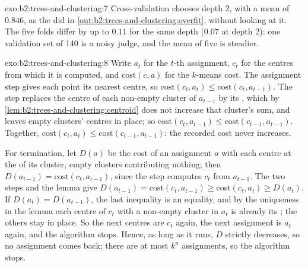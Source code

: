 \begin{solution}{exo:b2:trees-and-clustering:7}
Cross-validation chooses depth 2, with a mean of $0.846$, as the  did in \cref{out:b2:trees-and-clustering:overfit},
without looking at it. The five folds differ by up to $0.11$ for the same depth ($0.07$ at depth 2): one validation set of 140 is a noisy
judge, and the mean of five is steadier.
\end{solution}

\begin{solution}{exo:b2:trees-and-clustering:8}
Write $a_t$ for the $t$-th assignment, $c_t$ for the centres from which it is computed, and $\mathrm{cost}(c, a)$ for
the $k$-means cost. The assignment step gives each point its nearest centre, so $\mathrm{cost}(c_t, a_t) \leq
\mathrm{cost}(c_t, a_{t-1})$. The  step replaces the centre of each non-empty cluster of $a_{t-1}$ by its
, which by \cref{lem:b2:trees-and-clustering:centroid} does not increase that cluster's sum, and leaves empty
clusters' centres in place; so $\mathrm{cost}(c_t, a_{t-1}) \leq \mathrm{cost}(c_{t-1}, a_{t-1})$. Together,
$\mathrm{cost}(c_t, a_t) \leq \mathrm{cost}(c_{t-1}, a_{t-1})$: the recorded cost never increases.

For termination, let $D(a)$ be the cost of an assignment $a$ with each centre at the  of its cluster, empty
clusters contributing nothing; then $D(a_{t-1}) = \mathrm{cost}(c_t, a_{t-1})$, since the  step computes $c_t$
from $a_{t-1}$. The two steps and the lemma give $D(a_{t-1}) = \mathrm{cost}(c_t, a_{t-1}) \geq \mathrm{cost}(c_t, a_t)
\geq D(a_t)$. If $D(a_t) = D(a_{t-1})$, the last inequality is an equality, and by the uniqueness in the lemma each
centre of $c_t$ with a non-empty cluster in $a_t$ is already its ; the others stay in place. So the next centres
are $c_t$ again, the next assignment is $a_t$ again, and the algorithm stops. Hence, as long as it runs, $D$ strictly
decreases, so no assignment comes back; there are at most $k^n$ assignments, so the algorithm stops.
\end{solution}

